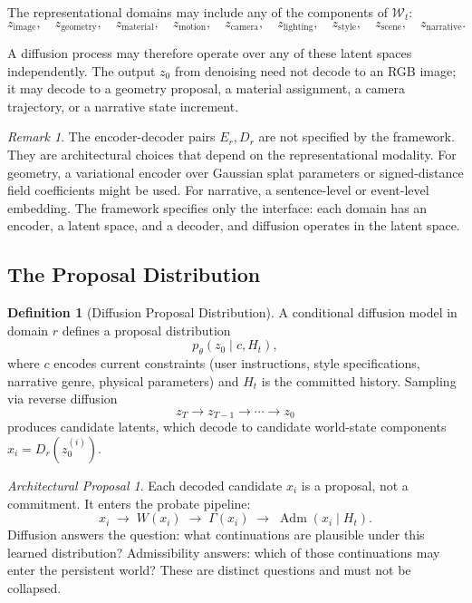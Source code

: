 \documentclass[12pt,a4paper]{article}
\theoremstyle{plain}
\theoremstyle{definition}
\newtheorem{definition}[theorem]{Definition}
\theoremstyle{remark}
\newtheorem{remark}[theorem]{Remark}
\newtheorem{proposal}[theorem]{Architectural Proposal}
\DeclareMathOperator{\Adm}{Adm}
\begin{document}
The representational domains may include any of the components of $\mathcal{W}_t$:
\[
z_{\mathrm{image}}, \quad
z_{\mathrm{geometry}}, \quad
z_{\mathrm{material}}, \quad
z_{\mathrm{motion}}, \quad
z_{\mathrm{camera}}, \quad
z_{\mathrm{lighting}}, \quad
z_{\mathrm{style}}, \quad
z_{\mathrm{scene}}, \quad
z_{\mathrm{narrative}}.
\]

A diffusion process may therefore operate over any of these latent spaces independently. The output $z_0$ from denoising need not decode to an RGB image; it may decode to a geometry proposal, a material assignment, a camera trajectory, or a narrative state increment.

\begin{remark}
The encoder-decoder pairs $E_r, D_r$ are not specified by the framework. They are architectural choices that depend on the representational modality. For geometry, a variational encoder over Gaussian splat parameters or signed-distance field coefficients might be used. For narrative, a sentence-level or event-level embedding. The framework specifies only the interface: each domain has an encoder, a latent space, and a decoder, and diffusion operates in the latent space.
\end{remark}

\subsection{The Proposal Distribution}

\begin{definition}[Diffusion Proposal Distribution]
A conditional diffusion model in domain $r$ defines a proposal distribution
\[
p_\theta(z_0 \mid c, H_t),
\]
where $c$ encodes current constraints (user instructions, style specifications, narrative genre, physical parameters) and $H_t$ is the committed history. Sampling via reverse diffusion
\[
z_T \to z_{T-1} \to \cdots \to z_0
\]
produces candidate latents, which decode to candidate world-state components $x_i = D_r(z_0^{(i)})$.
\end{definition}

\begin{proposal}
\label{prop:diffusion-proposal}
Each decoded candidate $x_i$ is a proposal, not a commitment. It enters the probate pipeline:
\[
x_i \;\to\; W(x_i) \;\to\; \Gamma(x_i) \;\to\; \Adm(x_i \mid H_t).
\]
Diffusion answers the question: what continuations are plausible under this learned distribution? Admissibility answers: which of those continuations may enter the persistent world? These are distinct questions and must not be collapsed.
\end{proposal}
\end{document}
